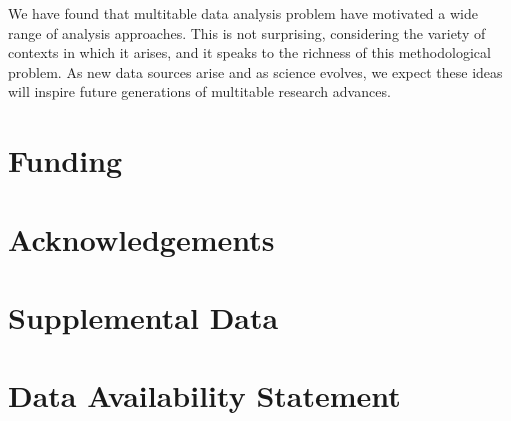 \documentclass[utf8]{frontiersFPHY} %
\begin{document}
We have found that multitable data analysis problem have motivated a wide range
of analysis approaches. This is not surprising, considering the variety of
contexts in which it arises, and it speaks to the richness of this
methodological problem. As new data sources arise and as science evolves, we
expect these ideas will inspire future generations of multitable research
advances.

\section*{Funding}
\section*{Acknowledgements}
\section*{Supplemental Data}
\section*{Data Availability Statement}


\end{document}

